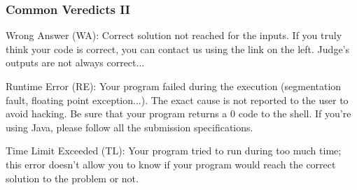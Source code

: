 \documentclass{beamer}
\begin{document}
\begin{frame}
	\frametitle {Common Veredicts II}
	
	\begin{block}{Wrong Answer (WA):}
	Correct solution not reached for the inputs. 
	If you truly think your code is correct, you can contact us using the link on the left. Judge's outputs are not always correct...
	\end{block}
	
	\begin{block}{Runtime Error (RE):}
	Your program failed during the execution (segmentation fault, floating point exception...). The exact cause is not reported to the user to avoid hacking. Be sure that your program returns a 0 code to the shell. If you're using Java, please follow all the submission specifications.
	\end{block}
	
	\begin{block}{Time Limit Exceeded (TL):}
	Your program tried to run during too much time; this error doesn't allow you to know if your program would reach the correct solution to the problem or not.
	\end{block}
	
\end{frame}
	
	
	
	
	
\end{document}

